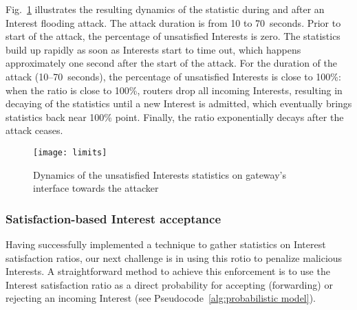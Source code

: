 Fig.~\ref{fig:ratio example} illustrates the resulting dynamics of the statistic during and after an Interest flooding attack. The attack duration is from 10 to 70~seconds. Prior to start of the attack, the percentage of unsatisfied Interests is zero.  
The statistics build up rapidly as soon as Interests start to time out, which happens approximately one second after the start of the attack.%
For the duration of the attack (10--70~seconds), the percentage of unsatisfied Interests is close to 100\%: 
when the ratio is close to 100\%, routers drop all incoming Interests, resulting in decaying of the statistics until a new Interest is admitted, which eventually brings statistics back near 100\% point.
Finally, the ratio exponentially decays after the attack ceases.

\begin{figure}[htbp]
  \centering
  \texttt{[image: limits]}
  \vspace{-0.3cm}
  \caption{Dynamics of the unsatisfied Interests statistics on gateway's interface towards the attacker}
  \label{fig:ratio example}
\end{figure}


\subsubsection{\textbf{Satisfaction-based Interest acceptance}}
\label{sec:probabilistic}

Having successfully implemented a technique to gather statistics on Interest satisfaction ratios, our next challenge is in using this rotio to penalize malicious Interests. A straightforward method to achieve this enforcement is to use the Interest satisfaction ratio as a direct probability for accepting (forwarding) or rejecting an incoming Interest (see Pseudocode~\ref{alg:probabilistic model}).




